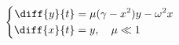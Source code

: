 \begin{frame}[t]
	\vspace{0.5em}
	\begin{columns}[c]
		\begin{column}{0.99\textwidth}
	\begin{equation*}
		\left\{
		\begin{aligned}
			\diff{y}{t} & =\mu(\gamma-x^2)y-\omega^2x\\%
			\diff{x}{t}  &=y, \quad \mu \ll 1
		\end{aligned}
		\right.
	\end{equation*}		
		\end{column}
	\end{columns}
\end{frame}
